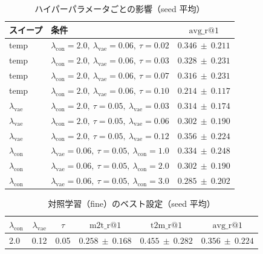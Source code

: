 \begin{table}[H]
  \centering
  \caption{ハイパーパラメータごとの影響（seed 平均）}
  \label{tab:contrastive_sweeps}
  \begin{tabular}{llc} \toprule
    \textbf{スイープ}        & \textbf{条件}                                                          & $\mathrm{avg\_r@1}$ \\ \midrule
    temp                     & $\lambda_{\mathrm{con}}=2.0,\ \lambda_{\mathrm{vae}}=0.06,\ \tau=0.02$ & $0.346\ \pm\ 0.211$ \\
    temp                     & $\lambda_{\mathrm{con}}=2.0,\ \lambda_{\mathrm{vae}}=0.06,\ \tau=0.03$ & $0.328\ \pm\ 0.231$ \\
    temp                     & $\lambda_{\mathrm{con}}=2.0,\ \lambda_{\mathrm{vae}}=0.06,\ \tau=0.07$ & $0.316\ \pm\ 0.231$ \\
    temp                     & $\lambda_{\mathrm{con}}=2.0,\ \lambda_{\mathrm{vae}}=0.06,\ \tau=0.10$ & $0.214\ \pm\ 0.117$ \\
    \midrule
    $\lambda_{\mathrm{vae}}$ & $\lambda_{\mathrm{con}}=2.0,\ \tau=0.05,\ \lambda_{\mathrm{vae}}=0.03$ & $0.314\ \pm\ 0.174$ \\
    $\lambda_{\mathrm{vae}}$ & $\lambda_{\mathrm{con}}=2.0,\ \tau=0.05,\ \lambda_{\mathrm{vae}}=0.06$ & $0.302\ \pm\ 0.190$ \\
    $\lambda_{\mathrm{vae}}$ & $\lambda_{\mathrm{con}}=2.0,\ \tau=0.05,\ \lambda_{\mathrm{vae}}=0.12$ & $0.356\ \pm\ 0.224$ \\
    \midrule
    $\lambda_{\mathrm{con}}$ & $\lambda_{\mathrm{vae}}=0.06,\ \tau=0.05,\ \lambda_{\mathrm{con}}=1.0$ & $0.334\ \pm\ 0.248$ \\
    $\lambda_{\mathrm{con}}$ & $\lambda_{\mathrm{vae}}=0.06,\ \tau=0.05,\ \lambda_{\mathrm{con}}=2.0$ & $0.302\ \pm\ 0.190$ \\
    $\lambda_{\mathrm{con}}$ & $\lambda_{\mathrm{vae}}=0.06,\ \tau=0.05,\ \lambda_{\mathrm{con}}=3.0$ & $0.285\ \pm\ 0.202$ \\ \bottomrule
  \end{tabular}
\end{table}

\begin{table}[H]
  \centering
  \caption{対照学習（fine）のベスト設定（seed 平均）}
  \label{tab:contrastive_best}
  \begin{tabular}{lccccc} \toprule
    $\lambda_{\mathrm{con}}$ & $\lambda_{\mathrm{vae}}$ & $\tau$ & $\mathrm{m2t\_r@1}$ & $\mathrm{t2m\_r@1}$ & $\mathrm{avg\_r@1}$ \\ \midrule
    2.0                      & 0.12                     & 0.05   & $0.258\ \pm\ 0.168$ & $0.455\ \pm\ 0.282$ & $0.356\ \pm\ 0.224$ \\ \bottomrule
  \end{tabular}
\end{table}

